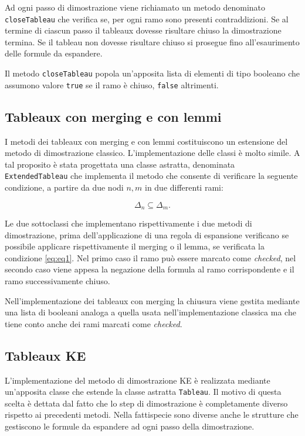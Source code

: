 \documentclass[12pt,a4paper]{article}
\theoremstyle{plain}
\theoremstyle{definition}
\theoremstyle{remark}
\begin{document}
Ad ogni passo di dimostrazione viene richiamato un metodo denominato \texttt{closeTableau} che verifica se, per ogni ramo
sono presenti contraddizioni. Se al termine di ciascun passo il tableaux dovesse risultare chiuso la dimostrazione termina.
Se il tableau non dovesse risultare chiuso si prosegue fino all'esaurimento delle formule da espandere.

Il metodo \texttt{closeTableau} popola un'apposita lista di elementi di tipo booleano che assumono valore \texttt{true} se
il ramo è chiuso, \texttt{false} altrimenti.

\subsection*{Tableaux con merging e con lemmi}
I metodi dei tableaux con merging e con lemmi costituiscono un estensione del metodo di dimostrazione classico. L'implementazione
delle classi è molto simile. A tal proposito è stata progettata una classe astratta, denominata \texttt{ExtendedTableau} che
implementa il metodo che consente di verificare la seguente condizione, a partire da due nodi $n,m$ in due differenti rami:

\begin{equation}
\Delta_n\subseteq \Delta_m.
\label{eq:eq1}
\end{equation}

Le due sottoclassi che implementano rispettivamente i due metodi di dimostrazione, prima dell'applicazione di una regola
di espansione verificano se possibile applicare rispettivamente il merging o il lemma, se verificata la condizione 
\eqref{eq:eq1}. Nel primo caso il ramo può essere marcato come \textit{checked}, nel secondo caso viene appesa la negazione
della formula al ramo corrispondente e il ramo successivamente chiuso.

Nell'implementazione dei tableaux con merging la chiusura viene gestita mediante una lista di booleani analoga a quella
usata nell'implementazione classica ma che tiene conto anche dei rami marcati come \textit{checked}. 

\subsection*{Tableaux KE}
L'implementazione del metodo di dimostrazione KE è realizzata mediante un'apposita classe che estende la classe astratta
\texttt{Tableau}. Il motivo di questa scelta è dettata dal fatto che lo step di dimostrazione è completamente diverso
rispetto ai precedenti metodi. Nella fattispecie sono diverse anche le strutture che gestiscono le formule da espandere
ad ogni passo della dimostrazione.
\end{document}

